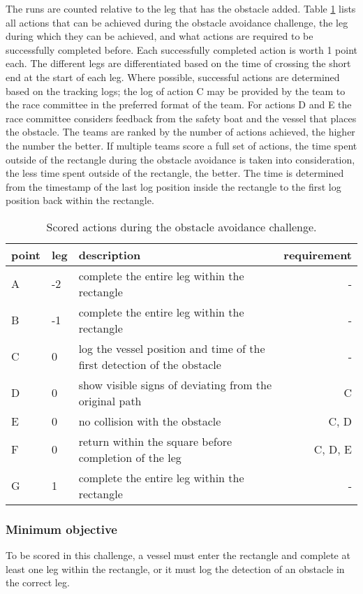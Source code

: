 \documentclass[12pt]{article}
\begin{document}
The runs are counted relative to the leg that has the obstacle added. Table
\ref{tab:obstacleActions} lists all actions that can be achieved during the
obstacle avoidance challenge, the leg during which they can be achieved, and
what actions are required to be successfully completed before.
Each successfully completed action is worth 1 point each. The different legs are
differentiated based on the time of crossing the short end at the start of each leg.
Where possible, successful actions are determined based on the tracking logs;
the log of action C may be provided by the team to the race committee in the
preferred format of the team. For actions D and E the race committee considers 
feedback from the safety boat
and the vessel that places the obstacle.
The teams are ranked by the number of actions achieved, the higher the number
the better. If multiple teams score a full set of actions, the time spent outside of the
rectangle during the obstacle avoidance is taken into consideration, the less
time spent outside of the rectangle, the better. The time is determined from the
timestamp of the last log position inside the rectangle to the first log position 
back within the rectangle.

\begin{table}
\centering
\begin{tabular}{l|l|p{8cm}|r}
point & leg & description & requirement \\
\hline
\hline
A & -2 & complete the entire leg within the rectangle & - \\
\hline
B & -1 & complete the entire leg within the rectangle & - \\
\hline
C & 0  & log the vessel position and time of the first detection of the obstacle & - \\
\hline
D & 0 & show visible signs of deviating from the original path & C \\
\hline
E & 0 & no collision with the obstacle & C, D\\
\hline
F & 0 & return within the square before completion of the leg & C, D, E\\
\hline
G & 1 & complete the entire leg within the rectangle & - \\
\hline
\end{tabular}
\caption{Scored actions during the obstacle avoidance challenge.}
\label{tab:obstacleActions}
\end{table}


\subsubsection{Minimum objective}
To be scored in this challenge, a vessel must enter the rectangle and complete
at least one leg within the rectangle, or it must log the detection of an
obstacle in the correct leg.
\end{document}
